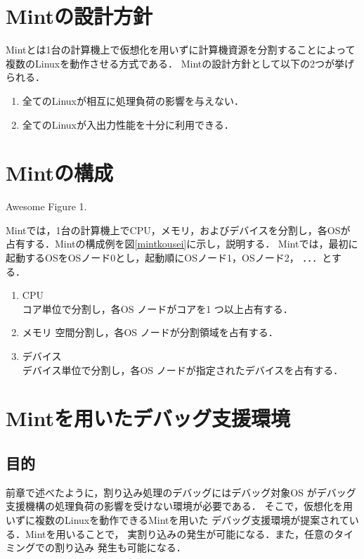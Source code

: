\documentclass[tanilab-enum]{graduate}
\begin{document}
\section{Mintの設計方針}
Mintとは1台の計算機上で仮想化を用いずに計算機資源を分割することによって
複数のLinuxを動作させる方式である．
Mintの設計方針として以下の2つが挙げられる．
\begin{enumerate}
    \item 全てのLinuxが相互に処理負荷の影響を与えない．
    \item 全てのLinuxが入出力性能を十分に利用できる．
\end{enumerate}
\section{Mintの構成}
{Awesome Figure 1.}

Mintでは，1台の計算機上でCPU，メモリ，およびデバイスを分割し，各OSが
占有する．Mintの構成例を図\ref{mintkousei}に示し，説明する．
Mintでは，最初に起動するOSをOSノード0とし，起動順にOSノード1，OSノード2，
．．．とする．
\begin{enumerate}
    \item CPU\\
        コア単位で分割し，各OS ノードがコアを1 つ以上占有する．
    \item メモリ
        空間分割し，各OS ノードが分割領域を占有する．
    \item デバイス\\
        デバイス単位で分割し，各OS ノードが指定されたデバイスを占有する．
\end{enumerate}
\section{Mintを用いたデバッグ支援環境}
    \subsection{目的}
    前章で述べたように，割り込み処理のデバッグにはデバッグ対象OS
    がデバッグ支援機構の処理負荷の影響を受けない環境が必要である．
    そこで，仮想化を用いずに複数のLinuxを動作できるMintを用いた
    デバッグ支援環境が提案されている．Mintを用いることで，
    実割り込みの発生が可能になる．また，任意のタイミングでの割り込み
    発生も可能になる．
\end{document}
